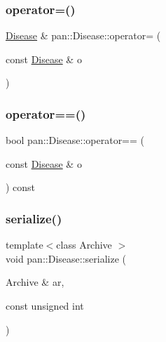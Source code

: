 \mbox{\label{classpan_1_1_disease_a7f828d68e1c0cccc7bffcef529ab547f}} 
\subsubsection{\texorpdfstring{operator=()}{operator=()}}
{\footnotesize\ttfamily \hyperlink{classpan_1_1_disease}{Disease} \& pan\+::\+Disease\+::operator= (\begin{DoxyParamCaption}\item[{const \hyperlink{classpan_1_1_disease}{Disease} \&}]{o }\end{DoxyParamCaption})}

\mbox{\label{classpan_1_1_disease_a8f0c036eba650a230abb91bd8334d150}} 
\subsubsection{\texorpdfstring{operator==()}{operator==()}}
{\footnotesize\ttfamily bool pan\+::\+Disease\+::operator== (\begin{DoxyParamCaption}\item[{const \hyperlink{classpan_1_1_disease}{Disease} \&}]{o }\end{DoxyParamCaption}) const\hspace{0.3cm}{\ttfamily [inline]}}

\mbox{\label{classpan_1_1_disease_a6fcfb95df953d991c96188ea2966583a}} 
\subsubsection{\texorpdfstring{serialize()}{serialize()}}
{\footnotesize\ttfamily template$<$class Archive $>$ \\
void pan\+::\+Disease\+::serialize (\begin{DoxyParamCaption}\item[{Archive \&}]{ar,  }\item[{const unsigned}]{int }\end{DoxyParamCaption})\hspace{0.3cm}{\ttfamily [inline]}}


